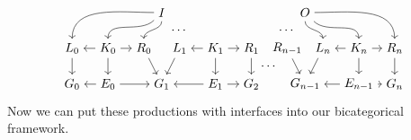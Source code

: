\documentclass[11pt]{amsart}
\theoremstyle{remark}
\theoremstyle{definition}
\begin{document}
\begin{equation}
\label{diag.DerivationChain}
\begin{tikzpicture}
	\node (G0) at (0,-1) {$G_0$};
	\node (E0) at (1,-1) {$E_0$};
	\node (G1) at (2.5,-1) {$G_1$};
	\node (E1) at (4,-1) {$E_1$};
	\node (G2) at (5,-1) {$G_2$};
	\node (Gn-1) at (6.5,-1) {$G_{n-1}$};
	\node (En-1) at (8,-1) {$E_{n-1}$};
	\node (Gn) at (9,-1) {$G_n$};
	\node (L0) at (0,0) {$L_0$};
	\node (K0) at (1,0) {$K_0$};
	\node (R0) at (2,0) {$R_0$};
	\node (L1) at (3,0) {$L_1$};
	\node (K1) at (4,0) {$K_1$};
	\node (R1) at (5,0) {$R_1$};
	\node (Rn-1) at (6,0) {$R_{n-1}$};
	\node (Ln) at (7,0) {$L_n$};
	\node (Kn) at (8,0) {$K_n$};
	\node (Rn) at (9,0) {$R_n$};
	\node (I) at (2.5,1) {$I$};
	\node (O) at (6.5,1) {$O$};
	\node (dots) at (5.5,-0.5) {$\dotsm$};
	\draw [->] (L0) edge (G0);
	\draw [->] (K0) edge (E0);
	\draw [->] (R0) edge (G1);
	\draw [->] (L1) edge (G1);
	\draw [->] (K1) edge (E1);
	\draw [->] (R1) edge (G2);
	\draw [->] (Rn-1) edge (Gn-1);
	\draw [->] (Ln) edge (Gn-1);
	\draw [->] (Kn) edge (En-1);
	\draw [->] (Rn) edge (Gn);
	\draw [->] (K0) edge (L0);
	\draw [->] (K0) edge (R0);
	\draw [->] (K1) edge (L1);
	\draw [->] (K1) edge (R1);
	\draw [->] (Kn) edge (Ln);
	\draw [->] (Kn) edge (Rn);
	\draw [->] (E0) edge (G0);
	\draw [->] (E0) edge (G1);
	\draw [->] (E1) edge (G1);
	\draw [->] (E1) edge (G2);
	\draw [->] (En-1) edge (Gn-1);
	\draw [->] (En-1) edge (Gn);
	\draw [->] (I) edge[out=180,in=90] (L0);
	\draw [->] (I) edge[out=225,in=90] (K0);
	\draw [->] (I) edge[out=270,in=90] (R0);
	\draw [->] (O) edge [out=0,in=90] (Rn);
	\draw [->] (O) edge [out=-45,in=90] (Kn);
	\draw [->] (O) edge [out=-90,in=90] (Ln);
	\node (Idots) at (3,0.5) {$\dotsm$};
	\node (Odots) at (6,0.5) {$\dotsm$};
\end{tikzpicture}
\end{equation}
Now we can put these productions with interfaces into our bicategorical framework.
\end{document}
